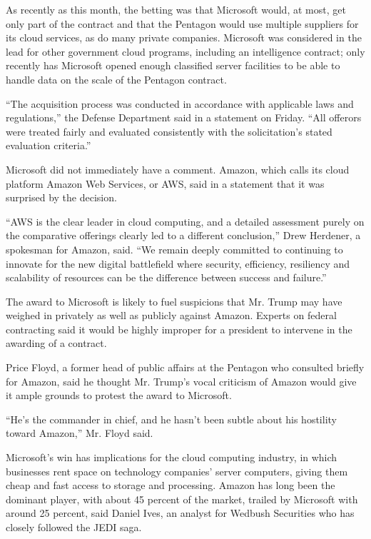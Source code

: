As recently as this month, the betting was that Microsoft would, at
most, get only part of the contract and that the Pentagon would use
multiple suppliers for its cloud services, as do many private companies.
Microsoft was considered in the lead for other government cloud
programs, including an intelligence contract; only recently has
Microsoft opened enough classified server facilities to be able to
handle data on the scale of the Pentagon contract.

``The acquisition process was conducted in accordance with applicable
laws and regulations,'' the Defense Department said in a statement on
Friday. ``All offerors were treated fairly and evaluated consistently
with the solicitation's stated evaluation criteria.''

Microsoft did not immediately have a comment. Amazon, which calls its
cloud platform Amazon Web Services, or AWS, said in a statement that it
was surprised by the decision.

``AWS is the clear leader in cloud computing, and a detailed assessment
purely on the comparative offerings clearly led to a different
conclusion,'' Drew Herdener, a spokesman for Amazon, said. ``We remain
deeply committed to continuing to innovate for the new digital
battlefield where security, efficiency, resiliency and scalability of
resources can be the difference between success and failure.''

The award to Microsoft is likely to fuel suspicions that Mr. Trump may
have weighed in privately as well as publicly against Amazon. Experts on
federal contracting said it would be highly improper for a president to
intervene in the awarding of a contract.

Price Floyd, a former head of public affairs at the Pentagon who
consulted briefly for Amazon, said he thought Mr. Trump's vocal
criticism of Amazon would give it ample grounds to protest the award to
Microsoft.

``He's the commander in chief, and he hasn't been subtle about his
hostility toward Amazon,'' Mr. Floyd said.

Microsoft's win has implications for the cloud computing industry, in
which businesses rent space on technology companies' server computers,
giving them cheap and fast access to storage and processing. Amazon has
long been the dominant player, with about 45 percent of the market,
trailed by Microsoft with around 25 percent, said Daniel Ives, an
analyst for Wedbush Securities who has closely followed the JEDI saga.

